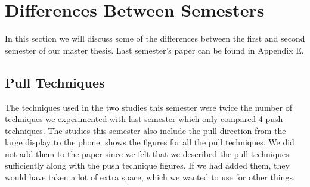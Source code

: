 \section*{Differences Between Semesters} \label{sec:experiments}
In this section we will discuss some of the differences between the first and second semester of our master thesis. 
Last semester's paper can be found in Appendix E.

\subsection*{Pull Techniques}
The techniques used in the two studies this semester were twice the number of techniques we experimented with last semester which only compared 4 push techniques.
The studies this semester also include the pull direction from the large display to the phone.
 shows the figures for all the pull techniques. 
We did not add them to the paper since we felt that we described the pull techniques sufficiently along with the push technique figures.
If we had added them, they would have taken a lot of extra space, which we wanted to use for other things. 



